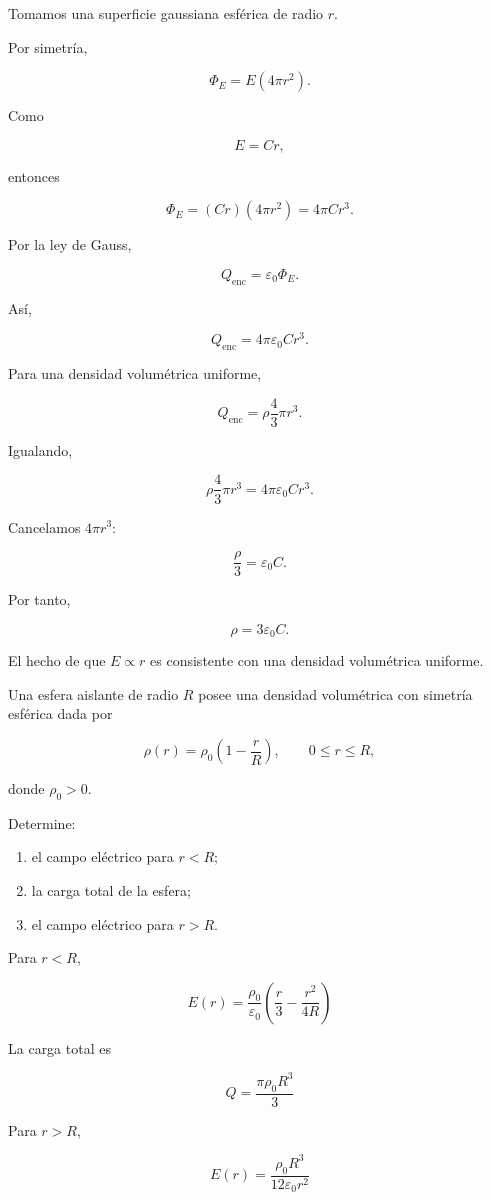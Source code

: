 \begin{explicacion}

Tomamos una superficie gaussiana esférica de radio \(r\).

Por simetría,

\[
\Phi_E=E(4\pi r^2).
\]

Como

\[
E=Cr,
\]

entonces

\[
\Phi_E=(Cr)(4\pi r^2)
=4\pi Cr^3.
\]

Por la ley de Gauss,

\[
Q_{\text{enc}}
=
\varepsilon_0\Phi_E.
\]

Así,

\[
Q_{\text{enc}}
=
4\pi\varepsilon_0Cr^3.
\]

Para una densidad volumétrica uniforme,

\[
Q_{\text{enc}}
=
\rho\frac43\pi r^3.
\]

Igualando,

\[
\rho\frac43\pi r^3
=
4\pi\varepsilon_0Cr^3.
\]

Cancelamos \(4\pi r^3\):

\[
\frac{\rho}{3}
=
\varepsilon_0C.
\]

Por tanto,

\[
\boxed{\rho=3\varepsilon_0C}.
\]

El hecho de que \(E\propto r\) es consistente con una densidad volumétrica uniforme.

\end{explicacion}


\begin{ejercicio}

Una esfera aislante de radio \(R\) posee una densidad volumétrica con simetría
esférica dada por

\[
\rho(r)=\rho_0\left(1-\frac{r}{R}\right),
\qquad 0\leq r\leq R,
\]

donde \(\rho_0>0\).

Determine:

\begin{enumerate}
    \item el campo eléctrico para \(r<R\);
    \item la carga total de la esfera;
    \item el campo eléctrico para \(r>R\).
\end{enumerate}

\end{ejercicio}

\begin{respuesta}

Para \(r<R\),

\[
\boxed{
E(r)
=
\frac{\rho_0}{\varepsilon_0}
\left(
\frac{r}{3}
-
\frac{r^2}{4R}
\right)
}
\]

La carga total es

\[
\boxed{
Q=\frac{\pi\rho_0R^3}{3}
}
\]

Para \(r>R\),

\[
\boxed{
E(r)
=
\frac{\rho_0R^3}
{12\varepsilon_0r^2}
}
\]

\end{respuesta}

